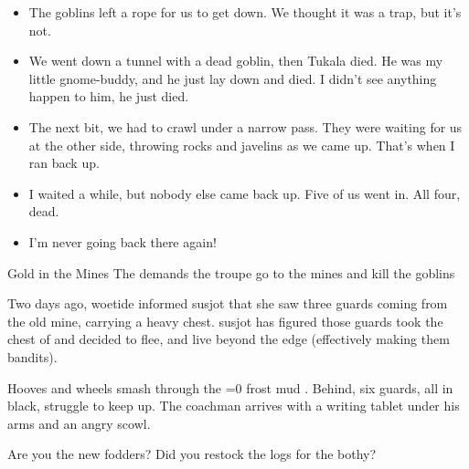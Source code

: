 \begin{multicols}{2}
\begin{speechtext}
\begin{itemize}
    \item
    The goblins left a rope for us to get down.
    We thought it was a trap, but it's not.
    
    \item
    We went down a tunnel with a dead goblin, then Tukala died.
    He was my little gnome-buddy, and he just lay down and died.
    I didn't see anything happen to him, he just died.
    
    \item
    The next bit, we had to crawl under a narrow pass.
    They were waiting for us at the other side, throwing rocks and javelins as we came up.
    That's when I ran back up.
    
    \item
    I waited a while, but nobody else came back up.
    Five of us went in.
    All four, dead.
    \item
    I'm never going back there again!
  \end{itemize}
\end{speechtext}

{Gold in the Mines}%
{The  demands the troupe go to the mines and kill the goblins}%

\begin{exampletext}
  Two days ago, \gls{woetide} informed \gls{susjot} that she saw three \glspl{guard} coming from the old mine, carrying a heavy chest.
  \Gls{susjot} has figured those \glspl{guard} took the chest of  and decided to flee, and live beyond the \gls{edge} (effectively making them bandits).
\end{exampletext}

\begin{boxtext}
  Hooves and wheels smash through the
  \ifnum\value{temperature}=0%
    frost
  \else%
    mud
  \fi.
  Behind, six \glspl{guard}, all in black, struggle to keep up.
  The coachman arrives with a writing tablet under his arms and an angry scowl.
  \begin{speechtext}
      Are you the new \glspl{fodder}?
      Did you restock the logs for the \gls{bothy}?
  \end{speechtext}
\end{boxtext}


\end{multicols}
